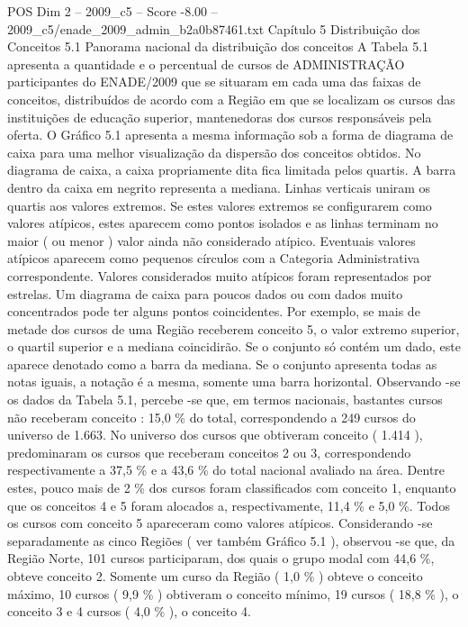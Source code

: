 \begin{textsample}{POS Dim 2 – 2009\_c5 – Score -8.00 – 2009\_c5/enade\_2009\_admin\_b2a0b87461.txt}  \label{ex:f2_pos_420}
Capítulo 5 Distribuição dos Conceitos 5.1 Panorama nacional da distribuição dos conceitos A Tabela 5.1 apresenta a quantidade e o percentual de cursos de ADMINISTRAÇÃO participantes do ENADE/2009 que se situaram em cada uma das faixas de conceitos, distribuídos de acordo com a Região em que se localizam os cursos das instituições de educação superior, mantenedoras dos cursos responsáveis pela oferta.
O Gráfico 5.1 apresenta a mesma informação sob a forma de diagrama de caixa para uma melhor visualização da dispersão dos conceitos obtidos.
No diagrama de caixa, a caixa propriamente dita fica limitada pelos quartis.
A barra dentro da caixa em negrito representa a mediana.
Linhas verticais uniram os quartis aos valores extremos.
Se estes valores extremos se configurarem como valores atípicos, estes aparecem como pontos isolados e as linhas terminam no maior ( ou menor ) valor ainda não considerado atípico.
Eventuais valores atípicos aparecem como pequenos círculos com a Categoria Administrativa correspondente.
Valores considerados muito atípicos foram representados por estrelas.
Um diagrama de caixa para poucos dados ou com dados muito concentrados pode ter alguns pontos coincidentes.
Por exemplo, se mais de metade dos cursos de uma Região receberem conceito 5, o valor extremo superior, o quartil superior e a mediana coincidirão.
Se o conjunto só contém um dado, este aparece denotado como a barra da mediana.
Se o conjunto apresenta todas as notas iguais, a notação é a mesma, somente uma barra horizontal.
Observando -se os dados da Tabela 5.1, percebe -se que, em termos nacionais, bastantes cursos não receberam conceito : 15,0 \% do total, correspondendo a 249 cursos do universo de 1.663.
No universo dos cursos que obtiveram conceito ( 1.414 ), predominaram os cursos que receberam conceitos 2 ou 3, correspondendo respectivamente a 37,5 \% e a 43,6 \% do total nacional avaliado na área.
Dentre estes, pouco mais de 2 \% dos cursos foram classificados com conceito 1, enquanto que os conceitos 4 e 5 foram alocados a, respectivamente, 11,4 \% e 5,0 \%.
Todos os cursos com conceito 5 apareceram como valores atípicos.
Considerando -se separadamente as cinco Regiões ( ver também Gráfico 5.1 ), observou -se que, da Região Norte, 101 cursos participaram, dos quais o grupo modal com 44,6 \%, obteve conceito 2.
Somente um curso da Região ( 1,0 \% ) obteve o conceito máximo, 10 cursos ( 9,9 \% ) obtiveram o conceito mínimo, 19 cursos ( 18,8 \% ), o conceito 3 e 4 cursos ( 4,0 \% ), o conceito 4.

\end{textsample}

